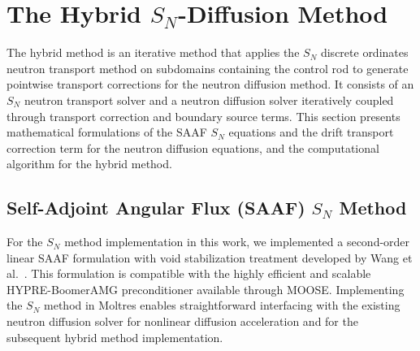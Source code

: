 \section{The Hybrid $S_N$-Diffusion Method} \label{sec:hybrid}

The hybrid method is an iterative method that applies the $S_N$ discrete ordinates neutron
transport method on subdomains containing the control rod to generate pointwise transport
corrections for the neutron diffusion method. It consists of an $S_N$ neutron transport solver and
a neutron diffusion solver iteratively coupled through transport correction and boundary source
terms. This section presents mathematical formulations of the
\gls{SAAF} $S_N$ equations and the drift transport correction term for the
neutron diffusion equations, and the computational algorithm for the hybrid method.

\subsection{Self-Adjoint Angular Flux (SAAF) $S_N$ Method} \label{sec:saaf}

For the $S_N$ method implementation in this work, we implemented a second-order linear \gls{SAAF}
formulation with void stabilization treatment developed by Wang et al.\ \cite{wangDiffusionAccelerationSchemes2014}.
This formulation is compatible with the highly efficient and scalable HYPRE-BoomerAMG
preconditioner \cite{hypre_hypre_2022} available through \gls{MOOSE}. Implementing the $S_N$ method
in Moltres enables straightforward interfacing with the existing neutron diffusion solver for
nonlinear diffusion acceleration and for the subsequent hybrid method implementation.

